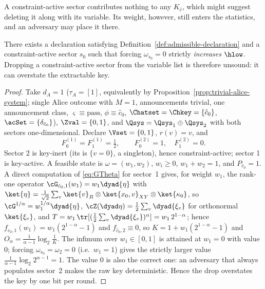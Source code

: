 
A constraint-active sector contributes nothing to any $K_{\hat c}$, which
might suggest deleting it along with its variable. Its weight, however,
still enters the statistics, and an adversary may place it there.

\begin{proposition}
\label{prop:retention}
There exists a declaration satisfying Definition~\ref{def:admissible-declaration} and a
constraint-active sector $s_0$ such that forcing $\omega_{s_0}=0$ strictly
\emph{increases} $\hlow$. Dropping a constraint-active sector from the
variable list is therefore unsound: it can overstate the extractable key.
\end{proposition}

\begin{proof}
Take $d_A=1$ ($\tau_A=[1]$, equivalently  by
Proposition~\ref{prop:trivial-alice-system}; single Alice outcome with
$M=1$, announcements
trivial, one announcement class, $\varsigma\equiv\mathrm{pass}$,
$\phi\equiv\hat c_0$, $\Chatset=\Chkey=\{\hat c_0\}$,
$\acSet=\{\delta_{\hat c_0}\}$), $\Zval=\{0,1\}$, and
$\Qsys=\Qsys_1\oplus\Qsys_2$ with both sectors one-dimensional. Declare
$\Vset=\{0,1\}$, $r(v)=v$, and
\begin{equation*}
  F^{(1)}_0=F^{(1)}_1=\tfrac12,
  \qquad
  F^{(2)}_0=1,\quad F^{(2)}_1=0 .
\end{equation*}
Sector 2 is key-inert (its  is $\{v=0\}$, a
singleton), hence constraint-active; sector 1 is key-active. A feasible
state is $\omega=(w_1,w_2)$, $w_i\ge0$, $w_1+w_2=1$, and
$P_{\hat c_0}=1$. A direct computation of \eqref{eq:GTheta} for sector~1
gives, for weight $w_1$, the rank-one operator
$\cG_{\hat c_0,1}(w_1)=w_1\dyad{\eta}$ with
$\ket{\eta}=\tfrac1{\sqrt2}\sum_{v}\ket{v}_R\otimes\ket{x_0,v}_{XY}
\otimes\ket{\kappa_0}$, so
$\cG^{1/\alpha}=w_1^{1/\alpha}\dyad{\eta}$,
$\cZ(\dyad\eta)=\tfrac12\sum_v\dyad{\xi_v}$ for orthonormal
$\ket{\xi_v}$, and
$T=w_1\,\tr[(\tfrac12\sum_v\dyad{\xi_v})^{\alpha}]=w_1\,2^{1-\alpha}$;
hence $f_{\hat c_0,1}(w_1)=w_1(2^{1-\alpha}-1)$ and
$f_{\hat c_0,2}\equiv0$, so
$K=1+w_1(2^{1-\alpha}-1)$ and
$O_{\alpha}=\frac{1}{\alpha-1}\log_2\frac{1}{K}$. The infimum over
$w_1\in[0,1]$ is attained at $w_1=0$ with value $0$; forcing
$\omega_{s_0}=\omega_2=0$ (i.e.\ $w_1=1$) gives the strictly larger value
$\frac{1}{\alpha-1}\log_2 2^{\alpha-1}=1$. The value $0$ is also the
correct one: an adversary that always populates sector~2 makes the raw key
deterministic. Hence the drop overstates the key by one bit per round.
\end{proof}
